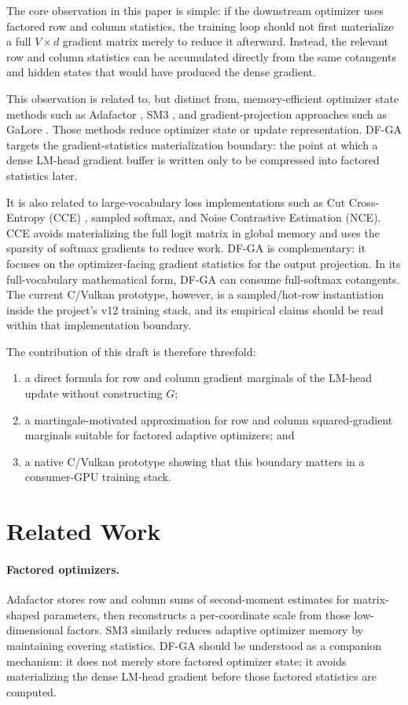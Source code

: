 \documentclass{article}
\begin{document}
The core observation in this paper is simple: if the downstream optimizer uses
factored row and column statistics, the training loop should not first
materialize a full $V \times d$ gradient matrix merely to reduce it afterward.
Instead, the relevant row and column statistics can be accumulated directly
from the same cotangents and hidden states that would have produced the dense
gradient.

This observation is related to, but distinct from, memory-efficient optimizer
state methods such as Adafactor \citep{shazeer2018adafactor}, SM3
\citep{anil2019sm3}, and gradient-projection approaches such as GaLore
\citep{zhao2024galore}. Those methods reduce optimizer state or update
representation. DF-GA targets the gradient-statistics materialization boundary:
the point at which a dense LM-head gradient buffer is written only to be
compressed into factored statistics later.

It is also related to large-vocabulary loss implementations such as Cut
Cross-Entropy (CCE) \citep{wijmans2024cut}, sampled softmax, and Noise
Contrastive Estimation (NCE). CCE avoids materializing the full logit matrix in
global memory and uses the sparsity of softmax gradients to reduce work. DF-GA
is complementary: it focuses on the optimizer-facing gradient statistics for
the output projection. In its full-vocabulary mathematical form, DF-GA can
consume full-softmax cotangents. The current C/Vulkan prototype, however, is a
sampled/hot-row instantiation inside the project's v12 training stack, and its
empirical claims should be read within that implementation boundary.

The contribution of this draft is therefore threefold:
\begin{enumerate}
  \item a direct formula for row and column gradient marginals of the LM-head
  update without constructing $G$;
  \item a martingale-motivated approximation for row and column
  squared-gradient marginals suitable for factored adaptive optimizers; and
  \item a native C/Vulkan prototype showing that this boundary matters in a
  consumer-GPU training stack.
\end{enumerate}

\section{Related Work}

\paragraph{Factored optimizers.}
Adafactor \citep{shazeer2018adafactor} stores row and column sums of
second-moment estimates for matrix-shaped parameters, then reconstructs a
per-coordinate scale from those low-dimensional factors. SM3
\citep{anil2019sm3} similarly reduces adaptive optimizer memory by maintaining
covering statistics. DF-GA should be understood as a companion mechanism: it
does not merely store factored optimizer state; it avoids materializing the
dense LM-head gradient before those factored statistics are computed.
\end{document}
